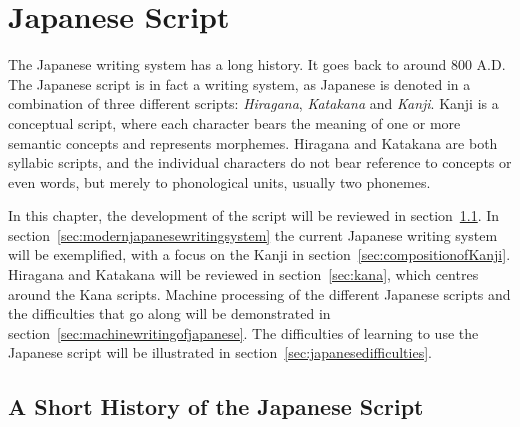 
\chapter{Japanese Script}
\label{chap:japanasescript}


The Japanese writing system has a long history. It goes back to around 800 A.D. 
The Japanese script is in fact a writing system, as Japanese is denoted in 
a combination of three different scripts: \emph{Hiragana}, \emph{Katakana} and 
\emph{Kanji}. Kanji is a conceptual script, where each character bears the 
meaning of one or more semantic concepts and represents morphemes. 
Hiragana and Katakana are both syllabic scripts, and the individual characters do
not bear reference to concepts or even words, but merely to phonological units, 
usually two phonemes.

In this chapter, the development of the script will be reviewed in 
section~\ref{sec:ashorthistoryofjapanesewritingsystem}.
In section~\ref{sec:modernjapanesewritingsystem} the current Japanese writing 
system will be exemplified, with a focus on the Kanji in 
section~\ref{sec:compositionofKanji}. Hiragana and Katakana will be reviewed in
section~\ref{sec:kana}, which centres around the Kana scripts. 
Machine processing of the different Japanese scripts and the difficulties that
go along will be demonstrated in section~\ref{sec:machinewritingofjapanese}.
The difficulties of learning to use the Japanese script will be illustrated in 
section~\ref{sec:japanesedifficulties}.

\section{A Short History of the Japanese Script}
\label{sec:ashorthistoryofjapanesewritingsystem}

